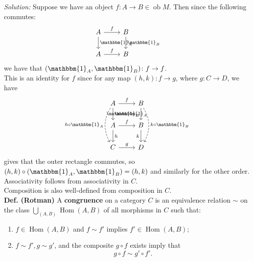 \documentclass[a4paper]{article}
\theoremstyle{plain}%
\theoremstyle{definition}
\theoremstyle{remark}
\DeclareMathOperator{\ob}{ob}
\DeclareMathOperator{\Hom}{Hom}
\begin{document}
\textit{Solution:} Suppose we have an object
$f  \colon A \to B \in \ob M$. Then since the following commutes:
\begin{equation*}
\begin{tikzcd}
    A \ar[d, "\mathbbm{1}_A"] \ar[r, "f"] & B \ar[d, "\mathbbm{1}_B"]\\
    A \ar[r, "f"] & B
\end{tikzcd}
\end{equation*}
we have that $(\mathbbm{1}_{A}, \mathbbm{1}_B)
 \colon f \to f$.\\
 This is an identity for $f$ since for any
 map $(h,k)  \colon f \to g$, where $g  \colon C \to D$, we have
 \begin{equation*}
 \begin{tikzcd}
     A \ar[dd, bend right, dashed, "h \circ \mathbbm{1}_A"'] \ar[d, "\mathbbm{1}_A"] \ar[r, "f"]
     & B \ar[d, "\mathbbm{1}_B"'] \ar[dd, bend left, dashed,
     " k \circ \mathbbm{1}_B"]\\
    A \ar[d, "h"] \ar[r, "f"] & B \ar[d, "k"']\\
    C \ar[r, "g"] & D
 \end{tikzcd}
 \end{equation*}
 gives that the outer rectangle commutes, so
 $(h,k) \circ (\mathbbm{1}_{A}, \mathbbm{1}_{B}) =
 (h,k)$ and similarly for the other order.\\
 \linebreak
 Associativity follows from associativity in $C$.\\
 Composition is also well-defined from composition in $C$.\\
 \linebreak
 \textbf{Def. (Rotman)} A \textbf{congruence} on a category
 $C$ is an equivalence relation $\sim$ on the class
 $\bigcup_{(A,B)} \Hom(A,B)$ of all morphisms in $C$ such that:
 \begin{enumerate}
     \item $f \in \Hom(A,B)$ and $f \sim f'$ implies
         $f' \in \Hom(A,B);$
     \item $f \sim f', g \sim g'$, and the composite $g \circ f$ exists imply
         that
         \[
         g \circ f \sim g' \circ f'.
         \] 
 \end{enumerate}
\end{document}
